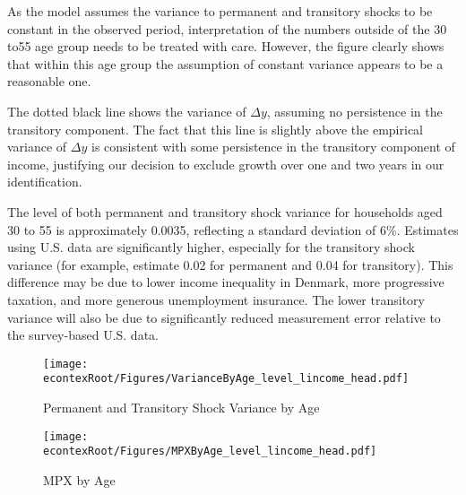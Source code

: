 \documentclass[titlepage]{\econtex}\newcommand{\texname}{ConsumptionHeterogeneity}
\begin{document}
As the model assumes the variance to permanent and transitory shocks to be constant in the observed period, interpretation of the numbers outside of the 30 to55 age group needs to be treated with care. However, the figure clearly shows that within this age group the assumption of constant variance appears to be a reasonable one.

The dotted black line shows the variance of $\Delta y$, assuming no persistence in the transitory component. The fact that this line is slightly above the empirical variance of $\Delta y$ is consistent with some persistence in the transitory component of income, justifying our decision to exclude growth over one and two years in our identification.

The level of both permanent and transitory shock variance for households aged 30 to 55 is approximately 0.0035, reflecting a standard deviation of 6\%. Estimates using U.S. data are significantly higher, especially for the transitory shock variance (for example, \cite{carroll_nature_1997} estimate 0.02 for permanent and 0.04 for transitory). This difference may be due to lower income inequality in Denmark, more progressive taxation, and more generous unemployment insurance. The lower transitory variance will also be due to significantly reduced measurement error relative to the survey-based U.S. data. 
\begin{figure} 
	\begin{centering}
		\texttt{[image: \\econtexRoot/Figures/VarianceByAge\_level\_lincome\_head.pdf]} 
		\caption{Permanent and Transitory Shock Variance by Age}
		\label{fig:VarianceByAge}
	\end{centering}
\end{figure}
\begin{figure} 
	\begin{centering}
		\texttt{[image: \\econtexRoot/Figures/MPXByAge\_level\_lincome\_head.pdf]} 
		\caption{MPX by Age}
		\label{fig:MPXByAge}
	\end{centering}
\end{figure}
\end{document}
